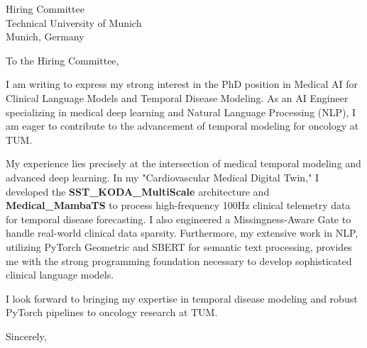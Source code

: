 \documentclass[11pt,a4paper]{letter}
\begin{document}
\begin{letter}{
    Hiring Committee \\
    Technical University of Munich \\
    Munich, Germany
}
\opening{To the Hiring Committee,}

I am writing to express my strong interest in the PhD position in Medical AI for Clinical Language Models and Temporal Disease Modeling. As an AI Engineer specializing in medical deep learning and Natural Language Processing (NLP), I am eager to contribute to the advancement of temporal modeling for oncology at TUM.

My experience lies precisely at the intersection of medical temporal modeling and advanced deep learning. In my "Cardiovascular Medical Digital Twin," I developed the \textbf{SST\_KODA\_MultiScale} architecture and \textbf{Medical\_MambaTS} to process high-frequency 100Hz clinical telemetry data for temporal disease forecasting. I also engineered a Missingness-Aware Gate to handle real-world clinical data sparsity. Furthermore, my extensive work in NLP, utilizing PyTorch Geometric and SBERT for semantic text processing, provides me with the strong programming foundation necessary to develop sophisticated clinical language models.

I look forward to bringing my expertise in temporal disease modeling and robust PyTorch pipelines to oncology research at TUM.

\closing{Sincerely,}
\end{letter}
\end{document}
